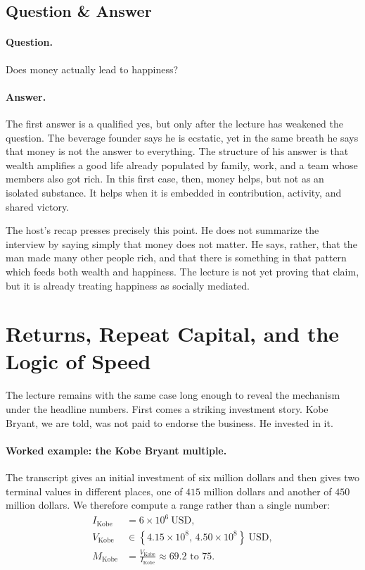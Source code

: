 \subsection{Question \& Answer}

\paragraph{Question.} Does money actually lead to happiness?

\paragraph{Answer.} The first answer is a qualified yes, but only after the lecture has weakened the question. The beverage founder says he is ecstatic, yet in the same breath he says that money is not the answer to everything. The structure of his answer is that wealth amplifies a good life already populated by family, work, and a team whose members also got rich. In this first case, then, money helps, but not as an isolated substance. It helps when it is embedded in contribution, activity, and shared victory.

The host's recap presses precisely this point. He does not summarize the interview by saying simply that money does not matter. He says, rather, that the man made many other people rich, and that there is something in that pattern which feeds both wealth and happiness. The lecture is not yet proving that claim, but it is already treating happiness as socially mediated.

\section{Returns, Repeat Capital, and the Logic of Speed}

The lecture remains with the same case long enough to reveal the mechanism under the headline numbers. First comes a striking investment story. Kobe Bryant, we are told, was not paid to endorse the business. He invested in it.

\paragraph{Worked example: the Kobe Bryant multiple.} The transcript gives an initial investment of six million dollars and then gives two terminal values in different places, one of \(415\) million dollars and another of \(450\) million dollars. We therefore compute a range rather than a single number:
\begin{align}
I_{\text{Kobe}} &= 6 \times 10^{6}\ \mathrm{USD},\\
V_{\text{Kobe}} &\in \left\{4.15 \times 10^{8},\,4.50 \times 10^{8}\right\}\ \mathrm{USD},\\
M_{\text{Kobe}} &= \frac{V_{\text{Kobe}}}{I_{\text{Kobe}}}
\approx 69.2 \text{ to } 75.
\end{align}

